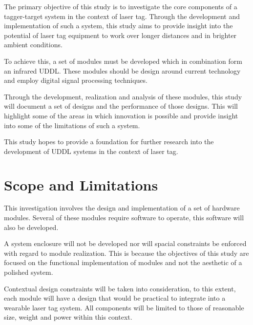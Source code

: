 

The primary objective of this study is to investigate the core components of a tagger-target system in the context of laser tag. Through the development and implementation of such a system, this study aims to provide insight into the potential of laser tag equipment to work over longer distances and in brighter ambient conditions.

To achieve this, a set of modules must be developed which in combination form an infrared UDDL. These modules should be design around current technology and employ digital signal processing techniques.

Through the development, realization and analysis of these modules, this study will document a set of designs and the performance of those designs. This will highlight some of the areas in which innovation is possible and provide insight into some of the limitations of such a system.

This study hopes to provide a foundation for further research into the development of UDDL systems in the context of laser tag.



\section{Scope and Limitations}


This investigation involves the design and implementation of a set of hardware modules. Several of these modules require software to operate, this software will also be developed.

A system enclosure will not be developed nor will spacial constraints be enforced with regard to module realization. This is because the objectives of this study are focused on the functional implementation of modules and not the aesthetic of a polished system.

Contextual design constraints will be taken into consideration, to this extent, each module will have a design that would be practical to integrate into a wearable laser tag system. All components will be limited to those of reasonable size, weight and power within this context.

